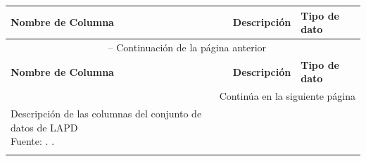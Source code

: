 \begin{longtable}{|p{2.5cm}|p{6cm}|p{5cm}|}
	\hline
	\textbf{Nombre de Columna} & \textbf{Descripción} & \textbf{Tipo de dato} \\
	\hline
	\endfirsthead
	
	\multicolumn{3}{c}{{\tablename\ \thetable{} -- Continuación de la página anterior}} \\
	\hline
	\textbf{Nombre de Columna} & \textbf{Descripción} & \textbf{Tipo de dato} \\
	\hline
	\endhead
	
	\hline
	\multicolumn{3}{r}{{Continúa en la siguiente página}} \\
	\endfoot
	
	\hline
	\caption{Descripción de las columnas del conjunto de datos de LAPD \\
		Fuente: \citep*{gl_LAPD}. \citetitle{gl_LAPD}.} \label{tab:lapd-data-description} \\
	\endlastfoot
	

\end{longtable}
